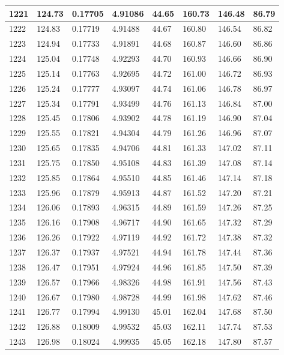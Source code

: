 \documentclass[12pt,a4paper,twoside]{article}
\begin{document}
\begin{center}
\begin{longtable}{l l l l | l l l l}
1221 & 124.73 & 0.17705 & 4.91086 & 44.65 & 160.73 & 146.48 & 86.79 \\ \hline
1222 & 124.83 & 0.17719 & 4.91488 & 44.67 & 160.80 & 146.54 & 86.82 \\ \hline
1223 & 124.94 & 0.17733 & 4.91891 & 44.68 & 160.87 & 146.60 & 86.86 \\ \hline
1224 & 125.04 & 0.17748 & 4.92293 & 44.70 & 160.93 & 146.66 & 86.90 \\ \hline
1225 & 125.14 & 0.17763 & 4.92695 & 44.72 & 161.00 & 146.72 & 86.93 \\ \hline
1226 & 125.24 & 0.17777 & 4.93097 & 44.74 & 161.06 & 146.78 & 86.97 \\ \hline
1227 & 125.34 & 0.17791 & 4.93499 & 44.76 & 161.13 & 146.84 & 87.00 \\ \hline
1228 & 125.45 & 0.17806 & 4.93902 & 44.78 & 161.19 & 146.90 & 87.04 \\ \hline
1229 & 125.55 & 0.17821 & 4.94304 & 44.79 & 161.26 & 146.96 & 87.07 \\ \hline
1230 & 125.65 & 0.17835 & 4.94706 & 44.81 & 161.33 & 147.02 & 87.11 \\ \hline
1231 & 125.75 & 0.17850 & 4.95108 & 44.83 & 161.39 & 147.08 & 87.14 \\ \hline
1232 & 125.85 & 0.17864 & 4.95510 & 44.85 & 161.46 & 147.14 & 87.18 \\ \hline
1233 & 125.96 & 0.17879 & 4.95913 & 44.87 & 161.52 & 147.20 & 87.21 \\ \hline
1234 & 126.06 & 0.17893 & 4.96315 & 44.89 & 161.59 & 147.26 & 87.25 \\ \hline
1235 & 126.16 & 0.17908 & 4.96717 & 44.90 & 161.65 & 147.32 & 87.29 \\ \hline
1236 & 126.26 & 0.17922 & 4.97119 & 44.92 & 161.72 & 147.38 & 87.32 \\ \hline
1237 & 126.37 & 0.17937 & 4.97521 & 44.94 & 161.78 & 147.44 & 87.36 \\ \hline
1238 & 126.47 & 0.17951 & 4.97924 & 44.96 & 161.85 & 147.50 & 87.39 \\ \hline
1239 & 126.57 & 0.17966 & 4.98326 & 44.98 & 161.91 & 147.56 & 87.43 \\ \hline
1240 & 126.67 & 0.17980 & 4.98728 & 44.99 & 161.98 & 147.62 & 87.46 \\ \hline
1241 & 126.77 & 0.17994 & 4.99130 & 45.01 & 162.04 & 147.68 & 87.50 \\ \hline
1242 & 126.88 & 0.18009 & 4.99532 & 45.03 & 162.11 & 147.74 & 87.53 \\ \hline
1243 & 126.98 & 0.18024 & 4.99935 & 45.05 & 162.18 & 147.80 & 87.57 \\ \hline

\end{longtable}
\end{center}
\end{document}
